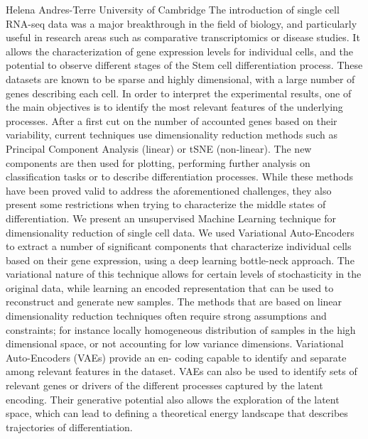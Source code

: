 {Helena Andres-Terre} {University of Cambridge}
The introduction of single cell RNA-seq data was a major breakthrough in the field of biology, and particularly useful in research areas such as comparative transcriptomics or disease studies. It allows the characterization of gene expression levels for individual cells, and the potential to observe different stages of the Stem cell differentiation process.
These datasets are known to be sparse and highly dimensional, with a large number of genes describing each cell. In order to interpret the experimental results, one of the main objectives is to identify the most relevant features of the underlying processes. After a first cut on the number of accounted genes based on their variability, current techniques use dimensionality reduction methods such as Principal Component Analysis (linear) or tSNE (non-linear). The new components are then used for plotting, performing further analysis on classification tasks or to describe differentiation processes. While these methods have been proved valid to address the aforementioned challenges, they also present some restrictions when trying to characterize the middle states of differentiation.
We present an unsupervised Machine Learning technique for dimensionality reduction of single cell data. We used Variational Auto-Encoders to extract a number of significant components that characterize individual cells based on their gene expression, using a deep learning bottle-neck approach.
The variational nature of this technique allows for certain levels of stochasticity in the original data, while learning an encoded representation that can be used to reconstruct and generate new samples.
The methods that are based on linear dimensionality reduction techniques often require strong assumptions and constraints; for instance locally homogeneous distribution of samples in the high dimensional space, or not accounting for low variance dimensions. Variational Auto-Encoders (VAEs) provide an en- coding capable to identify and separate among relevant features in the dataset.
VAEs can also be used to identify sets of relevant genes or drivers of the different processes captured by the latent encoding. Their generative potential also allows the exploration of the latent space, which can lead to defining a theoretical energy landscape that describes trajectories of differentiation.

